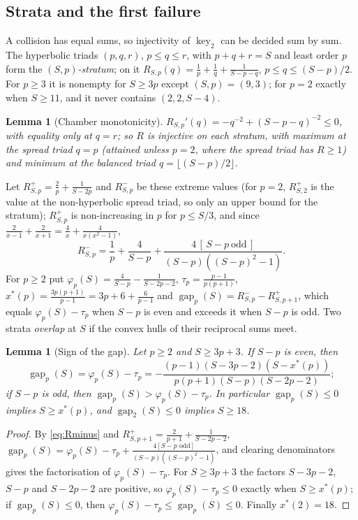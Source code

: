 \documentclass[pdflatex,sn-mathphys-num]{sn-jnl}
\theoremstyle{thmstyleone}%
\newtheorem{lemma}[theorem]{Lemma}%
\theoremstyle{thmstylethree}%
\newcommand{\keytwo}{\operatorname{key}_2}
\newcommand{\gap}{\operatorname{gap}}
\begin{document}
\subsection{Strata and the first failure}

A collision has equal sums, so injectivity of $\keytwo$ can be decided sum by sum. The hyperbolic triads $(p,q,r)$, $p\le q\le r$, with $p+q+r=S$ and least order $p$ form the \emph{$(S,p)$-stratum}; on it $R_{S,p}(q)=\frac1p+\frac1q+\frac1{S-p-q}$, $p\le q\le(S-p)/2$. For $p\ge3$ it is nonempty for $S\ge3p$ except $(S,p)=(9,3)$; for $p=2$ exactly when $S\ge11$, and it never contains $(2,2,S-4)$.

\begin{lemma}[Chamber monotonicity]\label{lem:chamber}
$R_{S,p}'(q)=-q^{-2}+(S-p-q)^{-2}\le0$, with equality only at $q=r$; so $R$ is injective on each stratum, with maximum at the spread triad $q=p$ (attained unless $p=2$, where the spread triad has $R\ge1$) and minimum at the balanced triad $q=\lfloor(S-p)/2\rfloor$.
\end{lemma}

Let $R^+_{S,p}=\frac2p+\frac1{S-2p}$ and $R^-_{S,p}$ be these extreme values (for $p=2$, $R^+_{S,2}$ is the value at the non-hyperbolic spread triad, so only an upper bound for the stratum); $R^+_{S,p}$ is non-increasing in $p$ for $p\le S/3$, and since $\frac2{x-1}+\frac2{x+1}=\frac4x+\frac4{x(x^2-1)}$,
\begin{equation}\label{eq:Rminus}
  R^-_{S,p}=\frac1p+\frac4{S-p}+\frac{4\,[\,S-p\ \text{odd}\,]}{(S-p)((S-p)^2-1)} .
\end{equation}
For $p\ge2$ put $\varphi_p(S)=\frac4{S-p}-\frac1{S-2p-2}$, $\tau_p=\frac{p-1}{p(p+1)}$, $x^*(p)=\frac{3p(p+1)}{p-1}=3p+6+\frac6{p-1}$ and $\gap_p(S)=R^-_{S,p}-R^+_{S,p+1}$, which equals $\varphi_p(S)-\tau_p$ when $S-p$ is even and exceeds it when $S-p$ is odd. Two strata \emph{overlap} at $S$ if the convex hulls of their reciprocal sums meet.

\begin{lemma}[Sign of the gap]\label{lem:gapsign}
Let $p\ge2$ and $S\ge3p+3$. If $S-p$ is even, then
\[
  \gap_p(S)=\varphi_p(S)-\tau_p=-\frac{(p-1)(S-3p-2)(S-x^*(p))}{p(p+1)(S-p)(S-2p-2)} ;
\]
if $S-p$ is odd, then $\gap_p(S)>\varphi_p(S)-\tau_p$. In particular $\gap_p(S)\le0$ implies $S\ge x^*(p)$, and $\gap_2(S)\le0$ implies $S\ge18$.
\end{lemma}

\begin{proof}
By \eqref{eq:Rminus} and $R^+_{S,p+1}=\frac2{p+1}+\frac1{S-2p-2}$, $\gap_p(S)=\varphi_p(S)-\tau_p+\frac{4[S-p\text{ odd}]}{(S-p)((S-p)^2-1)}$, and clearing denominators gives the factorisation of $\varphi_p(S)-\tau_p$. For $S\ge3p+3$ the factors $S-3p-2$, $S-p$ and $S-2p-2$ are positive, so $\varphi_p(S)-\tau_p\le0$ exactly when $S\ge x^*(p)$; if $\gap_p(S)\le0$, then $\varphi_p(S)-\tau_p\le\gap_p(S)\le0$. Finally $x^*(2)=18$.
\end{proof}
\end{document}
